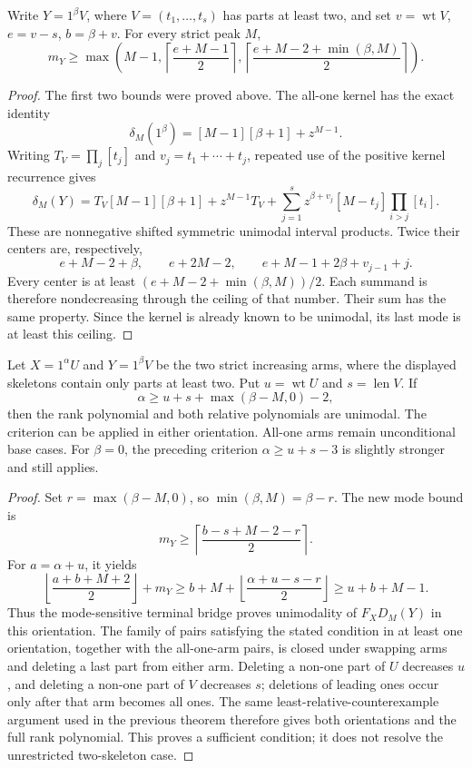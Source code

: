 \begin{proposition}
Write $Y=1^\beta V$, where $V=(t_1,\ldots,t_s)$ has parts at least
two, and set $v=\operatorname{wt}V$, $e=v-s$, $b=\beta+v$.
For every strict peak $M$,
\[
 m_Y\ge \max\left(M-1,
   \left\lceil\frac{e+M-1}{2}\right\rceil,
   \left\lceil\frac{e+M-2+\min(\beta,M)}{2}\right\rceil\right).
\]
\end{proposition}
\begin{proof}
The first two bounds were proved above. The all-one kernel has the
exact identity
\[
 \delta_M(1^\beta)=[M-1][\beta+1]+z^{M-1}.
\]
Writing $T_V=\prod_j[t_j]$ and $v_j=t_1+\cdots+t_j$, repeated
use of the positive kernel recurrence gives
\[
 \delta_M(Y)=T_V[M-1][\beta+1]+z^{M-1}T_V
 +\sum_{j=1}^s z^{\beta+v_j}[M-t_j]
                       \prod_{i>j}[t_i].
\]
These are nonnegative shifted symmetric unimodal interval products.
Twice their centers are, respectively,
\[
 e+M-2+\beta,\qquad e+2M-2,\qquad
 e+M-1+2\beta+v_{j-1}+j.
\]
Every center is at least
$(e+M-2+\min(\beta,M))/2$. Each summand is therefore
nondecreasing through the ceiling of that number. Their sum has
the same property. Since the kernel is already known to be unimodal,
its last mode is at least this ceiling.
\end{proof}

\begin{theorem}
Let $X=1^\alpha U$ and $Y=1^\beta V$ be the two strict increasing
arms, where the displayed skeletons contain only parts at least two.
Put $u=\operatorname{wt}U$ and $s=\operatorname{len}V$. If
\[
 \alpha\ge u+s+\max(\beta-M,0)-2,
\]
then the rank polynomial and both relative polynomials are unimodal.
The criterion can be applied in either orientation. All-one arms
remain unconditional base cases. For $\beta=0$, the preceding
criterion $\alpha\ge u+s-3$ is slightly stronger and still applies.
\end{theorem}
\begin{proof}
Set $r=\max(\beta-M,0)$, so $\min(\beta,M)=\beta-r$.
The new mode bound is
\[
 m_Y\ge\left\lceil\frac{b-s+M-2-r}{2}\right\rceil.
\]
For $a=\alpha+u$, it yields
\[
 \left\lfloor\frac{a+b+M+2}{2}\right\rfloor+m_Y
 \ge b+M+\left\lfloor\frac{\alpha+u-s-r}{2}\right\rfloor
 \ge u+b+M-1.
\]
Thus the mode-sensitive terminal bridge proves unimodality of
$F_XD_M(Y)$ in this orientation. The family of pairs satisfying
the stated condition in at least one orientation, together with
the all-one-arm pairs, is closed under swapping arms and deleting
a last part from either arm. Deleting a non-one part of $U$
decreases $u$, and deleting a non-one part of $V$ decreases $s$;
deletions of leading ones occur only after that arm becomes all ones.
The same least-relative-counterexample argument used in the
previous theorem therefore gives both orientations and the full
rank polynomial. This proves a sufficient condition; it does not
resolve the unrestricted two-skeleton case.
\end{proof}

